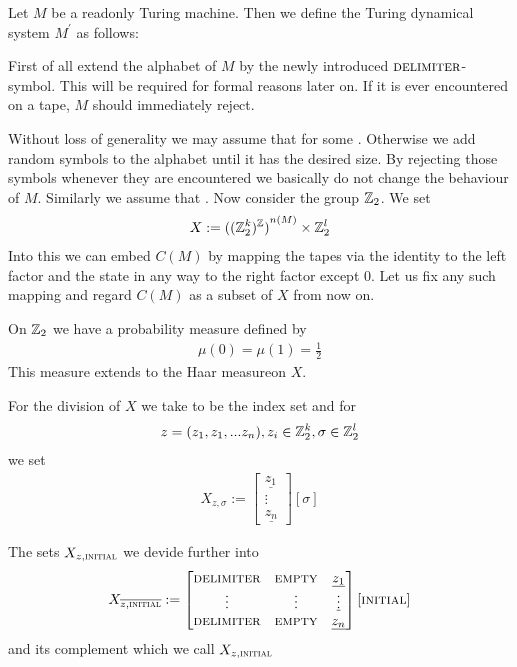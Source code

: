 Let $M$ be a readonly Turing machine.
Then we define the Turing dynamical system $M^\prime$ as follows:

First of all extend the alphabet of $M$ by the newly introduced $\text{\scshape{delimiter}}$-symbol. This will be required for formal reasons later on. If it is ever encountered on a tape, $M$ should immediately reject.

Without loss of generality we may assume that  for some .
Otherwise we add random symbols to the alphabet until it has the desired size. By rejecting those symbols whenever they are encountered we basically do not change the behaviour of $M$.
Similarly we assume that .
Now consider the group $\mathbb{Z}_2$.
We set
\begin{align*}
	X := {{((\mathbb{Z}_2^{k})^{\mathbb{Z}})}^{n(M)}} \times \mathbb{Z}_2^l
\end{align*}
Into this we can embed $C(M)$ by mapping the tapes via the identity to the left factor and the state in any way to the right factor except $0$.
Let us fix any such mapping and regard $C(M)$ as a subset of $X$ from now on.

On $\mathbb{Z}_2$ we have a probability measure defined by
\begin{align*}
	\mu(0) = \mu(1) = \frac12
\end{align*}
This measure extends to the Haar measure\footnotemark on $X$.

For the division of $X$ we take  to be the index set and for
\begin{align*}
	z = (z_1,z_1,...z_n), z_i \in \mathbb{Z}_2^k, \sigma \in \mathbb{Z}_2^l
\end{align*}
we set
\begin{align*}
	X_{z,\sigma} :=
	\begin{bmatrix}
		\underline{z_{1}} \\
		\vdots \\
		\underline{z_{n}}
	\end{bmatrix} [ \sigma ]
\end{align*}

The sets $X_{z,\text{\scshape{initial}}}$ we devide further into
\begin{align*}
	X_{\overline{z,\text{\scshape{initial}}}} :=
	\begin{bmatrix}
		\text{\scshape{delimiter}} & \text{\scshape{empty}} & \underline{z_1} \\
		\vdots & \vdots & \underline\vdots \\
		\text{\scshape{delimiter}} & \text{\scshape{empty}} & \underline{z_n} \\
	\end{bmatrix} [ \text{\scshape{initial}} ]
\end{align*}
and its complement which we call $X_{z,\text{\scshape{initial}}}$

